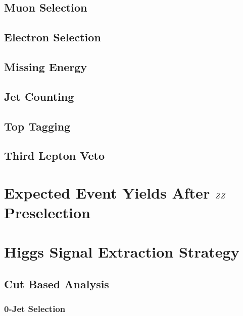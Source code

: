 \documentclass{cmspaper}
\begin{document}
  \subsection{Muon Selection} 
    \label{sec:sel_muons}
   
  \subsection{Electron Selection} 
    \label{sec:sel_electrons}
    
  \subsection{Missing Energy} 
    \label{sec:sel_met}
    
  \subsection{Jet Counting} 
    \label{sec:sel_jets}
    
  \subsection{Top Tagging}
    \label{sec:sel_toptag}
    
  \subsection{Third Lepton Veto}
    \label{sec:sel_other}
    

\section{Expected Event Yields After $ZZ$ Preselection}
  \label{sec:yields}
  

\clearpage    
\section{Higgs Signal Extraction Strategy}
  
  \label{sec:signal_selection}
  \subsection{Cut Based Analysis}
    \label{sec:anal_cutbased}
    \subsubsection{0-Jet Selection}
      \label{sec:sel_zerojet}
\end{document}
